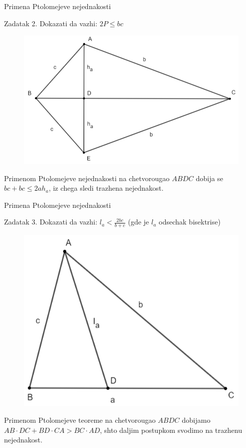 \documentclass{beamer}
\newcommand{\D}{\displaystyle}
\begin{document}
\begin{frame}{Primena Ptolomejeve nejednakosti}
    \begin{block}{Zadatak 2.}
    Dokazati da vazhi: $\D 2P\leq bc$
    \end{block}
\begin{figure} %
   \centering
    \includegraphics[scale=0.35]{Slika91}
\end{figure}
    Primenom Ptolomejeve nejednakosti na chetvorougao $ABDC$ dobija se $bc+bc\leq 2ah_a$, iz chega sledi trazhena nejednakost.
\end{frame}

\begin{frame}{Primena Ptolomejeve nejednakosti}
    \begin{block}{Zadatak 3.}
    Dokazati da vazhi: $\D l_a<\frac{2bc}{b+c}$ (gde je $l_a$ odsechak bisektrise)
    \end{block}
    \begin{figure} %
   \centering
    \includegraphics[scale=0.36]{Slika12}
\end{figure}
    Primenom Ptolomejeve teoreme na chetvorougao $ABDC$ dobijamo $\D AB\cdot DC+BD\cdot CA>BC\cdot AD$, shto daljim postupkom svodimo na trazhenu nejednakost.
\end{frame}
\end{document}
